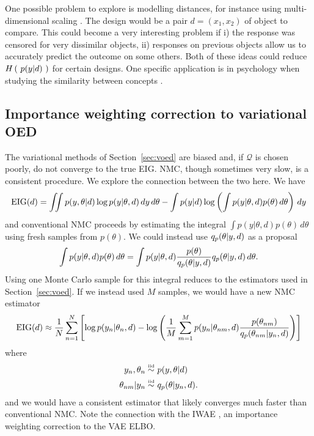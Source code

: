 One possible problem to explore is modelling distances, for instance using multi-dimensional scaling \cite{torgerson1952multidimensional}. The design would be a pair $d = (x_1, x_2)$ of object to compare. This could become a very interesting problem if i) the response was censored for very dissimilar objects, ii) responses on previous objects allow us to accurately predict the outcome on some others. Both of these ideas could reduce $H\left(\ p(y|d)\ \right)$ for certain designs. One specific application is in psychology when studying the similarity between concepts \cite{shepard1962analysis}.

\subsection{Importance weighting correction to variational OED}
The variational methods of Section~\ref{sec:voed} are biased and, if $\mathcal{Q}$ is chosen poorly, do not converge to the true EIG. NMC, though sometimes very slow, is a consistent procedure. We explore the connection between the two here. We have
\begin{equation}
	\text{EIG}(d) = \iint p(y, \theta | d) \log p(y|\theta, d) \, dy \, d\theta - \int p(y|d) \log \left( \int p(y|\theta,d) p(\theta) \, d\theta \right) \, dy
\end{equation}
and conventional NMC proceeds by estimating the integral $\int p(y|\theta,d) p(\theta) \, d\theta$ using fresh samples from $p(\theta)$. We could instead use $q_p(\theta|y,d)$ as a proposal
\begin{equation}
	\int p(y|\theta,d) p(\theta) \, d\theta = \int p(y|\theta,d) \frac{p(\theta)}{q_p(\theta|y,d)} q_p(\theta|y,d) \, d\theta.
\end{equation}
Using one Monte Carlo sample for this integral reduces to the estimators used in Section~\ref{sec:voed}. If we instead used $M$ samples, we would have a new NMC estimator
\begin{equation}
	\text{EIG}(d) \approx \frac{1}{N}\sum_{n=1}^N \left[ \log p(y_n | \theta_n, d) - \log \left(\frac{1}{M} \sum_{m=1}^M p(y_n | \theta_{nm}, d)\frac{p(\theta_{nm})}{q_p(\theta_{nm}|y_n,d)} \right) \right]
\end{equation}
where
\begin{align}
	y_n, \theta_n \overset{\text{\tiny iid}}{\sim} & \ p(y, \theta | d) \\
	\theta_{nm}|y_n \overset{\text{\tiny iid}}{\sim} & \ q_p(\theta|y_n,d).
\end{align}
and we would have a consistent estimator that likely converges much faster than conventional NMC. Note the connection with the IWAE \cite{iwae}, an importance weighting correction to the VAE ELBO.

